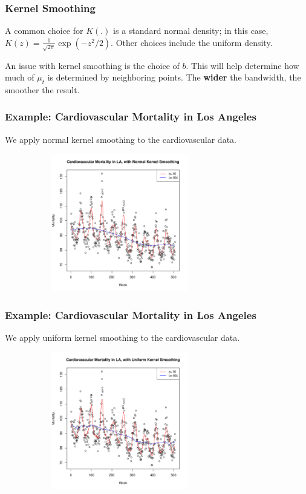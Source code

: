 \documentclass[%
xcolor=pdftex]{beamer}
\begin{document}
\begin{frame}
\frametitle{Kernel Smoothing}

A common choice for $K(.)$ is a standard normal density; in this case, $K(z) = \frac{1}{\sqrt{2\pi}} \exp(-z^2/2)$.  Other choices include the uniform density. \\

\vspace{5mm}

An issue with kernel smoothing is the choice of $b$.  This will help determine how much of $\mu_t$ is determined by neighboring points. The \textbf{wider} the bandwidth, the smoother the result.

\end{frame}

\begin{frame}
\frametitle{Example: Cardiovascular Mortality in Los Angeles}

We apply normal kernel smoothing to the cardiovascular data.

\includegraphics[width=100mm, height=60mm]{kernel_normal.pdf}

\end{frame}

\begin{frame}
\frametitle{Example: Cardiovascular Mortality in Los Angeles}

We apply uniform kernel smoothing to the cardiovascular data.

\includegraphics[width=100mm, height=60mm]{kernel_u.pdf}

\end{frame}
\end{document}

